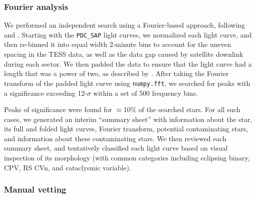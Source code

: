 \documentclass[11pt,twocolumn,tighten,linenumbers]{aastex63}
\begin{document}
\subsubsection{Fourier analysis}
\label{subsec:fourier}

We performed an independent search using a Fourier-based approach,
following \citet{2019ApJ...876..127Z} and \citet[][their
Section~1.3]{2023MNRAS.524.4220P}.  Starting with the {\tt PDC\_SAP}
light curves, we normalized each light curve, and then re-binned it
into equal width 2-minute bins to account for the uneven spacing in
the TESS data, as well as the data gap caused by satellite downlink
during each sector.  We then padded the data to ensure that the light
curve had a length that was a power of two, as described by
\citeauthor{2019ApJ...876..127Z}.  After taking the Fourier transform
of the padded light curve using {\tt numpy.fft}, we searched for peaks
with a significance exceeding 12-$\sigma$ within a set of 500
frequency bins.

Peaks of significance were found for $\approx$10\% of the searched
stars.  For all such cases, we generated an interim ``summary sheet''
with information about the star, its full and folded light curves,
Fourier transform, potential contaminating stars, and information
about these contaminating stars.  We then reviewed each summary sheet,
and tentatively classified each light curve based on visual inspection
of its morphology (with common categories including eclipsing binary,
CPV, RS CVn, and cataclysmic variable).



\subsubsection{Manual vetting}
\label{subsec:visual}
\end{document}
